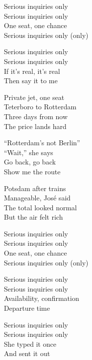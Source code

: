 \begin{lyrics}
Serious inquiries only\\
Serious inquiries only\\
One seat, one chance\\
Serious inquiries only (only)

Serious inquiries only\\
Serious inquiries only\\
If it’s real, it’s real\\
Then say it to me

Private jet, one seat\\
Teterboro to Rotterdam\\
Three days from now\\
The price lands hard

“Rotterdam’s not Berlin”\\
“Wait,” she says\\
Go back, go back\\
Show me the route

Potsdam after trains\\
Manageable, José said\\
The total looked normal\\
But the air felt rich

Serious inquiries only\\
Serious inquiries only\\
One seat, one chance\\
Serious inquiries only (only)

Serious inquiries only\\
Serious inquiries only\\
Availability, confirmation\\
Departure time

Serious inquiries only\\
Serious inquiries only\\
She typed it once\\
And sent it out
\end{lyrics}

